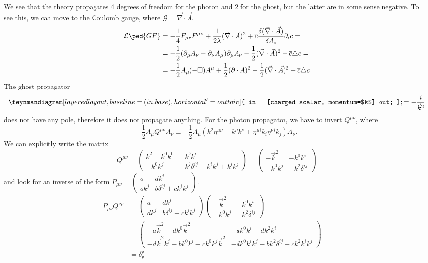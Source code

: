 \documentclass[a4paper,12pt]{book}
\begin{document}
We see that the theory propagates 4 degrees of freedom for the photon and 2 for the ghost, but the latter are in some sense negative. To see this, we can move to the Coulomb gauge, where $\mathcal G=\vec\nabla\cdot\vec A$.
\begin{align*}
\mathcal L\ped{GF}&=-\frac14F_{\mu\nu}F^{\mu\nu}+\frac1{2\lambda}(\vec\nabla\cdot\vec A)^2+\overline c\frac{\delta (\vec\nabla\cdot\vec A)}{\delta A_i}\partial_i c=\\
&=-\frac12(\partial_\mu A_\nu-\partial_\nu A_\mu)\partial_\mu A_\nu-\frac12(\vec\nabla\cdot\vec A)^2+\overline c\triangle c=\\
&=-\frac12A_\mu(-\Box)A^\mu+\frac12(\partial\cdot A)^2-\frac12(\vec\nabla\cdot\vec A)^2+\overline c\triangle c
\end{align*}
The ghost propagator
\[
\feynmandiagram [layered layout, baseline=(in.base), horizontal'=out to in] {
in -- [charged scalar, momentum=$k$] out;
};
=-\frac{i}{\vec k^2}
\]
does not have any pole, therefore it does not propagate anything. For the photon propagator, we have to invert $Q^{\mu\nu}$, where
\[-\frac12A_\mu Q^{\mu\nu}A_\nu\equiv-\frac12A_\mu(k^2\eta^{\mu\nu}-k^\mu k^\nu+\eta^{\mu i}k_i\eta^{\nu j}k_j)A_\nu.\]
We can explicitly write the matrix
\[
Q^{\mu\nu}=
\begin{pmatrix}
k^2-k^0k^0 & -k^0k^i\\
-k^0k^j & -k^2\delta^{ij}-k^ik^j+k^ik^j
\end{pmatrix}=
\begin{pmatrix}
-\vec k^2 & -k^0k^i\\
-k^0k^j & -k^2\delta^{ij}
\end{pmatrix}
\]
and look for an inverse of the form $P_{\mu\nu}=
\begin{pmatrix}
a & dk^i\\
dk^j & b\delta^{ij}+ck^ik^j
\end{pmatrix}$.
\begin{align*}
P_{\mu\nu}Q^{\nu\rho}&=\begin{pmatrix}
a & dk^i\\
dk^j & b\delta^{ij}+ck^ik^j
\end{pmatrix}
\begin{pmatrix}
-\vec k^2 & -k^0k^i\\
-k^0k^j & -k^2\delta^{ij}
\end{pmatrix}=\\
&=
\begin{pmatrix}
-a\vec k^2-dk^0\vec k^2 & -ak^0k^i-dk^2k^i\\
-d\vec k^2k^j-bk^0k^j-ck^0k^j\vec k^2 & -dk^0k^ik^j-bk^2\delta^{ij}-ck^2k^ik^j
\end{pmatrix}=\\
&=\delta^\rho_\mu
\end{align*}
\end{document}
